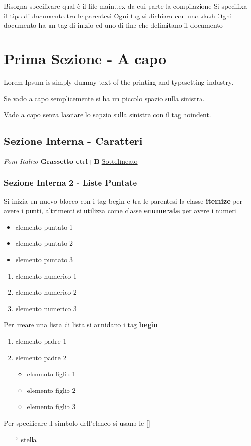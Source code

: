 \documentclass{article}
\begin{document}

Bisogna specificare qual è il file main.tex da cui parte la compilazione
Si specifixa il tipo di documento tra le parentesi
Ogni tag si dichiara con uno slash 
Ogni documento ha un tag di inizio ed uno di fine che delimitano il documento

\section{Prima Sezione - A capo}
\label{sezioneACapo}
Lorem Ipsum is simply dummy text of the printing and typesetting industry.

Se vado a capo semplicemente si ha un piccolo spazio sulla sinistra. 

\noindent Vado a capo senza lasciare lo sapzio sulla sinistra con il tag noindent. 

\subsection{Sezione Interna - Caratteri}
\textit{Font Italico}
\textbf{Grassetto ctrl+B}
\underline{Sottolineato}

\subsubsection{Sezione Interna 2 - Liste Puntate}
Si inizia un nuovo blocco con i tag begin e tra le parentesi la classe \textbf{itemize} per avere i punti, altrimenti si utilizza come classe \textbf{enumerate} per avere i numeri
\begin{itemize}
    \item elemento puntato 1
    \item elemento puntato 2
    \item elemento puntato 3
\end{itemize}
\begin{enumerate}
    \item elemento numerico 1
    \item elemento numerico 2
    \item elemento numerico 3
\end{enumerate}
Per creare una lista di lista si annidano i tag \textbf{begin}
\begin{enumerate}
\item elemento padre 1
\item elemento padre 2
    \begin{itemize}
        \item elemento figlio 1
        \item elemento figlio 2
        \item elemento figlio 3
    \end{itemize}
\end{enumerate}
Per specificare il simbolo dell'elenco si usano le []
\begin{itemize}
    \item [*] stella
\end{itemize}
\end{document}

